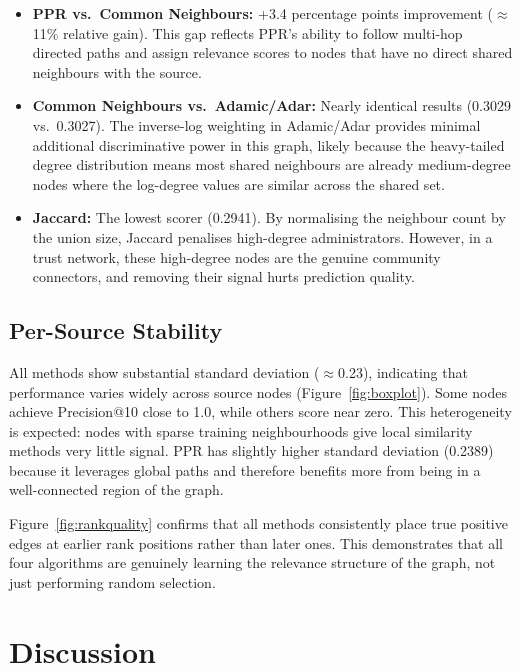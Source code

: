 \documentclass[10pt]{article}
\begin{document}
\begin{itemize}
  \item \textbf{PPR vs.\ Common Neighbours:} +3.4 percentage points improvement ($\approx$11\% relative gain). This gap reflects PPR's ability to follow multi-hop directed paths and assign relevance scores to nodes that have no direct shared neighbours with the source.
  \item \textbf{Common Neighbours vs.\ Adamic/Adar:} Nearly identical results (0.3029 vs.\ 0.3027). The inverse-log weighting in Adamic/Adar provides minimal additional discriminative power in this graph, likely because the heavy-tailed degree distribution means most shared neighbours are already medium-degree nodes where the log-degree values are similar across the shared set.
  \item \textbf{Jaccard:} The lowest scorer (0.2941). By normalising the neighbour count by the union size, Jaccard penalises high-degree administrators. However, in a trust network, these high-degree nodes are the genuine community connectors, and removing their signal hurts prediction quality.
\end{itemize}

\subsection{Per-Source Stability}

All methods show substantial standard deviation ($\approx$0.23), indicating that performance varies widely across source nodes (Figure~\ref{fig:boxplot}). Some nodes achieve Precision@10 close to 1.0, while others score near zero. This heterogeneity is expected: nodes with sparse training neighbourhoods give local similarity methods very little signal. PPR has slightly higher standard deviation (0.2389) because it leverages global paths and therefore benefits more from being in a well-connected region of the graph.

Figure~\ref{fig:rankquality} confirms that all methods consistently place true positive edges at earlier rank positions rather than later ones. This demonstrates that all four algorithms are genuinely learning the relevance structure of the graph, not just performing random selection.

\section{Discussion}
\label{sec:discussion}
\end{document}

